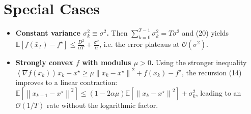 \documentclass{article}
\newcommand{\E}{\mathbb{E}}
\newcommand{\norm}[1]{\left\|#1\right\|}
\newcommand{\inner}[1]{\left\langle#1\right\rangle}
\begin{document}
\section*{Special Cases}
\begin{itemize}
\item \textbf{Constant variance $\sigma_{k}^{2}\equiv\sigma^{2}$.}
      Then $\sum_{k=0}^{T-1}\sigma_{k}^{2}=T\sigma^{2}$ and (20) yields
      $\E[f(\bar x_{T})-f^{\star}]\le
      \frac{D^{2}}{\alpha T}+\frac{\sigma^{2}}{\alpha}$,
      i.e. the error plateaus at $\mathcal O(\sigma^{2})$.
\item \textbf{Strongly convex $f$ with modulus $\mu>0$.}
      Using the stronger inequality
      $\inner{\nabla f(x_{k})}{x_{k}-x^{\star}}\ge
      \mu\norm{x_{k}-x^{\star}}^{2}+f(x_{k})-f^{\star}$,
      the recursion (14) improves to a linear contraction:
      $\E[\norm{x_{k+1}-x^{\star}}^{2}]\le(1-2\alpha\mu) \E[\norm{x_{k}-x^{\star}}^{2}]
      +\sigma_{k}^{2}$,
      leading to an $\mathcal O(1/T)$ rate without the logarithmic factor.
\end{itemize}
\end{document}
